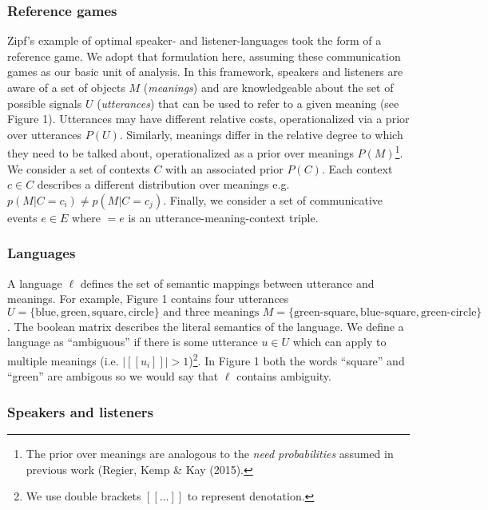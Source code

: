 \documentclass[10pt, letterpaper]{article}
\begin{document}
\subsubsection{Reference games}\label{reference-games}

Zipf's example of optimal speaker- and listener-languages took the form
of a reference game. We adopt that formulation here, assuming these
communication games as our basic unit of analysis. In this framework,
speakers and listeners are aware of a set of objects \(M\)
(\emph{meanings}) and are knowledgeable about the set of possible
signals \(U\) (\emph{utterances}) that can be used to refer to a given
meaning (see Figure 1). Utterances may have different relative costs,
operationalized via a prior over utterances \(P(U)\). Similarly,
meanings differ in the relative degree to which they need to be talked
about, operationalized as a prior over meanings
\(P(M)\)\footnote{The prior over meanings are analogous to the \textit{need probabilities} assumed in previous work (Regier, Kemp \& Kay (2015).}.
We consider a set of contexts \(C\) with an associated prior \(P(C)\).
Each context \(c\in C\) describes a different distribution over meanings
e.g. \(p(M|C=c_i) \neq p(M|C=c_j)\). Finally, we consider a set of
communicative events \(e \in E\) where \(<u, m, c> = e\) is an
utterance-meaning-context triple.\par

\subsubsection{Languages}\label{languages}

A language \(\ell\) defines the set of semantic mappings between
utterance and meanings. For example, Figure 1 contains four utterances
\(U = \{\text{blue}, \text{green}, \text{square}, \text{circle}\} \text{ and three meanings }M = \{\text{green-square}, \text{blue-square}, \text{green-circle}\}\).
The boolean matrix describes the literal semantics of the language. We
define a language as ``ambiguous'' if there is some utterance
\(u \in U\) which can apply to multiple meanings (i.e.
\(|[[u_i]]| > 1\))\footnote{We use double brackets $[[\dots]]$ to represent denotation.}.
In Figure 1 both the words ``square'' and ``green'' are ambigous so we
would say that \(\ell\) contains ambiguity.

\subsubsection{Speakers and listeners}\label{speakers-and-listeners}
\end{document}
